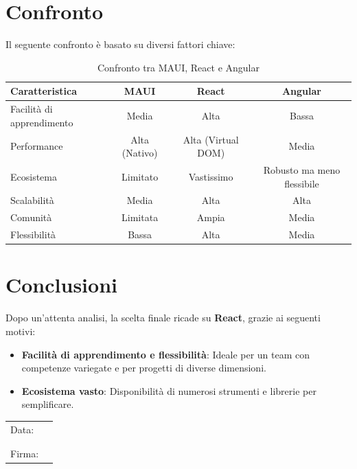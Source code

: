 \documentclass{article}
\begin{document}
\section{Confronto}
Il seguente confronto \`e basato su diversi fattori chiave:

\begin{table}[H]
    \centering
    \begin{tabular}{|l|c|c|c|}
        \hline
        \textbf{Caratteristica} & \textbf{MAUI} & \textbf{React} & \textbf{Angular} \\
        \hline
        Facilità di apprendimento & Media & Alta & Bassa \\
        \hline
        Performance & Alta (Nativo) & Alta (Virtual DOM) & Media \\
        \hline
        Ecosistema & Limitato & Vastissimo & Robusto ma meno flessibile \\
        \hline
        Scalabilità & Media & Alta & Alta \\
        \hline
        Comunità & Limitata & Ampia & Media \\
        \hline
        Flessibilità & Bassa & Alta & Media \\
        \hline
    \end{tabular}
    \caption{Confronto tra MAUI, React e Angular}
    \label{tab:confronto_framework}
\end{table}

\section{Conclusioni}
Dopo un'attenta analisi, la scelta finale ricade su \textbf{React}, grazie ai seguenti motivi:

\begin{itemize}
    \item \textbf{Facilit\`a di apprendimento e flessibilit\`a}: Ideale per un team con competenze variegate e per progetti di diverse dimensioni.
    \item \textbf{Ecosistema vasto}: Disponibilit\`a di numerosi strumenti e librerie per semplificare.
\end{itemize}

\begin{table}[b]
    \begin{tabular}{@{}p{.5in}p{4in}@{}}
        Data:  & \hrulefill \\
               &     		\\
               &     		\\
        Firma: & \hrulefill \\
    \end{tabular}
    \end{table}
\end{document}

